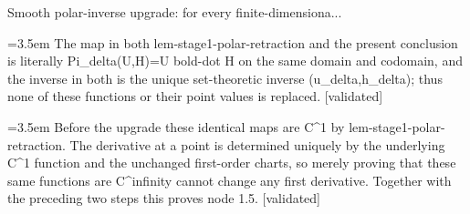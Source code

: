 \documentclass{article}
\newcommand{\step}[1]{\par\noindent\hangindent=3.5em\hangafter=1%
  \makebox[3.5em][l]{\textbf{#1.}}}
\newcommand{\steptag}[1]{\hfill{\small\textsf{[#1]}}}
\begin{document}
\begin{proofbox}{Smooth polar-inverse upgrade: for every finite-dimensiona...}
\step{1.5.2} The map in both lem-stage1-polar-retraction and the present conclusion is literally Pi\_delta(U,H)=U bold-dot H on the same domain and codomain, and the inverse in both is the unique set-theoretic inverse (u\_delta,h\_delta); thus none of these functions or their point values is replaced. \steptag{validated} \\[4pt]
\step{1.5.3} Before the upgrade these identical maps are C\textasciicircum{}1 by lem-stage1-polar-retraction. The derivative at a point is determined uniquely by the underlying C\textasciicircum{}1 function and the unchanged first-order charts, so merely proving that these same functions are C\textasciicircum{}infinity cannot change any first derivative. Together with the preceding two steps this proves node 1.5. \steptag{validated} \\[4pt]
\end{proofbox}
\end{document}
